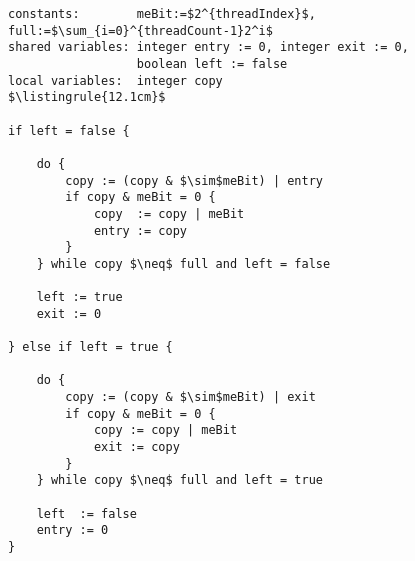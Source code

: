 \begin{minipage}
\centering
\begin{lstlisting}[mathescape, linewidth=12.1cm]
constants:        meBit:=$2^{threadIndex}$, full:=$\sum_{i=0}^{threadCount-1}2^i$
shared variables: integer entry := 0, integer exit := 0,
                  boolean left := false
local variables:  integer copy
$\listingrule{12.1cm}$

if left = false {

	do {
		copy := (copy & $\sim$meBit) | entry
		if copy & meBit = 0 {
			copy  := copy | meBit
			entry := copy
		}
	} while copy $\neq$ full and left = false

	left := true
	exit := 0

} else if left = true {

	do {
		copy := (copy & $\sim$meBit) | exit
		if copy & meBit = 0 {
			copy := copy | meBit
			exit := copy
		}
	} while copy $\neq$ full and left = true

	left  := false
	entry := 0
}
\end{lstlisting}
\end{minipage}
